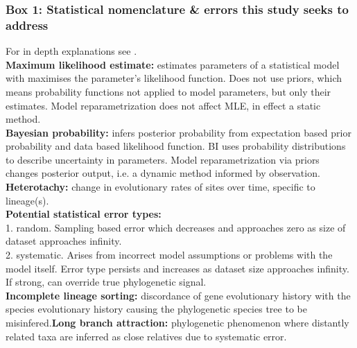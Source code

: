 \documentclass[12pt]{article}
\begin{document}
\subsubsection*{Box 1: Statistical nomenclature \& errors this study seeks to address}
For in depth explanations see \cite{yang2014molecular}.\\
\textbf{Maximum likelihood estimate:} 
estimates parameters of a statistical model with maximises the parameter's likelihood function. 
Does not use priors, which means probability functions not applied to model parameters, but only their estimates. 
Model reparametrization does not affect MLE, in effect a static method.\\
\textbf{Bayesian probability:}
infers posterior probability from expectation based prior probability and data based likelihood function.
BI uses probability distributions to describe uncertainty in parameters.
Model reparametrization via priors changes posterior output, i.e. a dynamic method informed by observation.\\
\textbf{Heterotachy:} 
change in evolutionary rates of sites over time, specific to lineage(s).\\
\textbf{Potential statistical error types:}\\
1. random. Sampling based error which decreases and approaches zero as size of dataset approaches infinity.\\
2. systematic. Arises from incorrect model assumptions or problems with the model itself. 
Error type persists and increases as dataset size approaches infinity. 
If strong, can override true phylogenetic signal.\\
\textbf{Incomplete lineage sorting:} discordance of gene evolutionary history with the species evolutionary history causing the phylogenetic species tree to be misinfered.\textbf{Long branch attraction:} phylogenetic phenomenon where distantly related taxa are inferred as close relatives due to systematic error.
\end{document}
